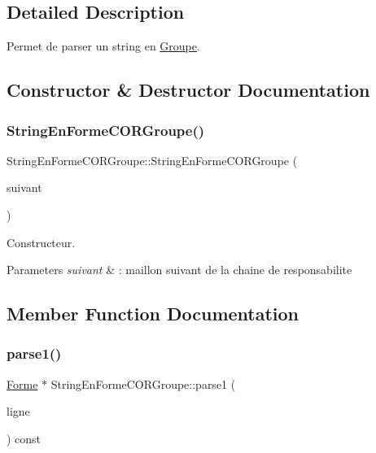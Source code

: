 \subsection{Detailed Description}
Permet de parser un string en \mbox{\hyperlink{class_groupe}{Groupe}}. 

\subsection{Constructor \& Destructor Documentation}
\mbox{\label{class_string_en_forme_c_o_r_groupe_a0680d95707cb01b8917f9f5ddaf3b2c5}} 
\subsubsection{\texorpdfstring{StringEnFormeCORGroupe()}{StringEnFormeCORGroupe()}}
{\footnotesize\ttfamily String\+En\+Forme\+C\+O\+R\+Groupe\+::\+String\+En\+Forme\+C\+O\+R\+Groupe (\begin{DoxyParamCaption}\item[{\mbox{\hyperlink{class_string_en_forme_c_o_r}{String\+En\+Forme\+C\+OR}} $\ast$}]{suivant }\end{DoxyParamCaption})\hspace{0.3cm}{\ttfamily [inline]}}



Constructeur. 


\begin{DoxyParams}{Parameters}
{\em suivant} & \+: maillon suivant de la chaine de responsabilite \\
\hline
\end{DoxyParams}


\subsection{Member Function Documentation}
\mbox{\label{class_string_en_forme_c_o_r_groupe_a1239a832ba17320a6b1e4a2e0fd66526}} 
\subsubsection{\texorpdfstring{parse1()}{parse1()}}
{\footnotesize\ttfamily \mbox{\hyperlink{class_forme}{Forme}} $\ast$ String\+En\+Forme\+C\+O\+R\+Groupe\+::parse1 (\begin{DoxyParamCaption}\item[{const string \&}]{ligne }\end{DoxyParamCaption}) const\hspace{0.3cm}{\ttfamily [virtual]}}



